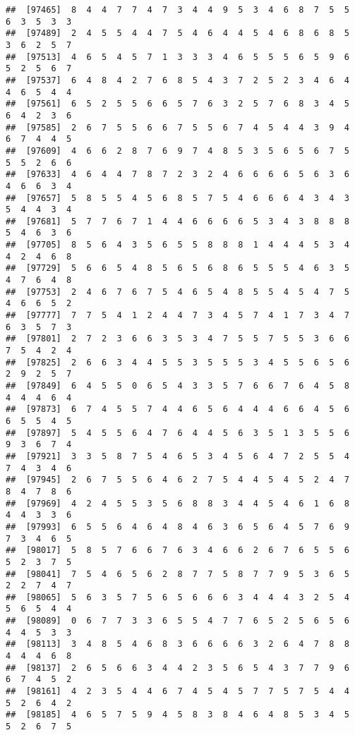 \documentclass[
]{book}
\begin{document}
\begin{verbatim}
##  [97465]  8  4  4  7  7  4  7  3  4  4  9  5  3  4  6  8  7  5  5  6  3  5  3  3
##  [97489]  2  4  5  5  4  4  7  5  4  6  4  4  5  4  6  8  6  8  5  3  6  2  5  7
##  [97513]  4  6  5  4  5  7  1  3  3  3  4  6  5  5  5  6  5  9  6  5  2  5  6  7
##  [97537]  6  4  8  4  2  7  6  8  5  4  3  7  2  5  2  3  4  6  4  4  6  5  4  4
##  [97561]  6  5  2  5  5  6  6  5  7  6  3  2  5  7  6  8  3  4  5  6  4  2  3  6
##  [97585]  2  6  7  5  5  6  6  7  5  5  6  7  4  5  4  4  3  9  4  6  7  4  4  5
##  [97609]  4  6  6  2  8  7  6  9  7  4  8  5  3  5  6  5  6  7  5  5  5  2  6  6
##  [97633]  4  6  4  4  7  8  7  2  3  2  4  6  6  6  6  5  6  3  6  4  6  6  3  4
##  [97657]  5  8  5  5  4  5  6  8  5  7  5  4  6  6  6  4  3  4  3  5  4  4  3  4
##  [97681]  5  7  7  6  7  1  4  4  6  6  6  6  5  3  4  3  8  8  8  5  4  6  3  6
##  [97705]  8  5  6  4  3  5  6  5  5  8  8  8  1  4  4  4  5  3  4  4  2  4  6  8
##  [97729]  5  6  6  5  4  8  5  6  5  6  8  6  5  5  5  4  6  3  5  4  7  6  4  8
##  [97753]  2  4  6  7  6  7  5  4  6  5  4  8  5  5  4  5  4  7  5  4  6  6  5  2
##  [97777]  7  7  5  4  1  2  4  4  7  3  4  5  7  4  1  7  3  4  7  6  3  5  7  3
##  [97801]  2  7  2  3  6  6  3  5  3  4  7  5  5  7  5  5  3  6  6  7  5  4  2  4
##  [97825]  2  6  6  3  4  4  5  5  3  5  5  5  3  4  5  5  6  5  6  2  9  2  5  7
##  [97849]  6  4  5  5  0  6  5  4  3  3  5  7  6  6  7  6  4  5  8  4  4  4  6  4
##  [97873]  6  7  4  5  5  7  4  4  6  5  6  4  4  4  6  6  4  5  6  6  5  5  4  5
##  [97897]  5  4  5  5  6  4  7  6  4  4  5  6  3  5  1  3  5  5  6  9  3  6  7  4
##  [97921]  3  3  5  8  7  5  4  6  5  3  4  5  6  4  7  2  5  5  4  7  4  3  4  6
##  [97945]  2  6  7  5  5  6  4  6  2  7  5  4  4  5  4  5  2  4  7  8  4  7  8  6
##  [97969]  4  2  4  5  5  3  5  6  8  8  3  4  4  5  4  6  1  6  8  4  4  3  3  6
##  [97993]  6  5  5  6  4  6  4  8  4  6  3  6  5  6  4  5  7  6  9  7  3  4  6  5
##  [98017]  5  8  5  7  6  6  7  6  3  4  6  6  2  6  7  6  5  5  6  5  2  3  7  5
##  [98041]  7  5  4  6  5  6  2  8  7  7  5  8  7  7  9  5  3  6  5  2  2  7  4  7
##  [98065]  5  6  3  5  7  5  6  5  6  6  6  3  4  4  4  3  2  5  4  5  6  5  4  4
##  [98089]  0  6  7  7  3  3  6  5  5  4  7  7  6  5  2  5  6  5  6  4  4  5  3  3
##  [98113]  3  4  8  5  4  6  8  3  6  6  6  6  3  2  6  4  7  8  8  4  4  4  6  8
##  [98137]  2  6  5  6  6  3  4  4  2  3  5  6  5  4  3  7  7  9  6  6  7  4  5  2
##  [98161]  4  2  3  5  4  4  6  7  4  5  4  5  7  7  5  7  5  4  4  5  2  6  4  2
##  [98185]  4  6  5  7  5  9  4  5  8  3  8  4  6  4  8  5  3  4  5  5  2  6  7  5

\end{verbatim}
\end{document}
